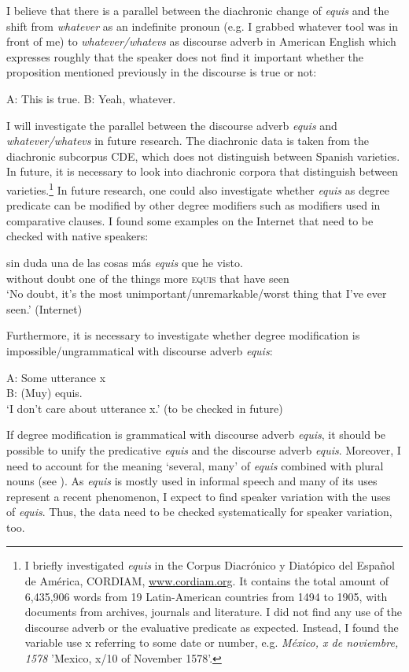 \documentclass[output=paper]{langsci/langscibook}
\begin{document}
I believe that there is a parallel between the diachronic change of \textit{equis} and the shift from \textit{whatever} as an indefinite pronoun (e.g. I grabbed whatever tool was in front of me) to \textit{whatever/whatevs} as discourse adverb in American English which expresses roughly that the speaker does not find it important whether the proposition mentioned previously in the discourse is true or not:

\ea\label{ex:kellert:70}
A: This is true. B: Yeah, whatever.
\z

I will investigate the parallel between the discourse adverb \textit{equis} and \textit{whatever/whatevs} in future research. The diachronic data is taken from the diachronic subcorpus CDE, which does not distinguish between Spanish varieties. In future, it is necessary to look into diachronic corpora that distinguish between varieties.\footnote{I briefly investigated \textit{equis} in the Corpus Diacrónico y Diatópico del Español de América, CORDIAM, \href{http://www.cordiam.org}{www.cordiam.org}. It contains the total amount of 6,435,906 words from 19 Latin-American countries from 1494 to 1905, with documents from archives, journals and literature. I did not find any use of the discourse adverb or the evaluative predicate as expected. Instead, I found the variable use x referring to some date or number, e.g. \textit{México, x de noviembre, 1578} 'Mexico, x/10 of November 1578'.}
In future research, one could also investigate whether \textit{equis} as degree predicate can be modified by other degree modifiers such as modifiers used in comparative clauses. I found some examples on the Internet that need to be checked with native speakers:

\ea\label{ex:kellert:71}
\gll sin duda una de las cosas más \textit{equis} que he visto.\\
without doubt one of the things more \textsc{equis} that have seen\\
\glt ‘No doubt, it’s the most unimportant/unremarkable/worst thing that I’ve ever seen.’ (Internet)
\z

Furthermore, it is necessary to investigate whether degree modification is impossible/ungrammatical with discourse adverb \textit{equis}:

\ea\label{ex:kellert:72}
\gll A: Some utterance x \\
B: (Muy) equis.\\
\glt ‘I don’t care about utterance x.’ (to be checked in future)
\z

If degree modification is grammatical with discourse adverb \textit{equis}, it should be possible to unify the predicative \textit{equis} and the discourse adverb \textit{equis}. Moreover, I need to account for the meaning ‘several, many’ of \textit{equis} combined with plural nouns (see ).
As \textit{equis} is mostly used in informal speech and many of its uses represent a recent phenomenon, I expect to find speaker variation with the uses of \textit{equis}. Thus, the data need to be checked systematically for speaker variation, too.


{\sloppy\printbibliography[heading=subbibliography,notkeyword=this]}
\end{document}
